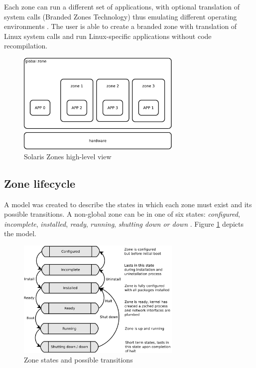 \documentclass[11pt]{book}
\begin{document}
        Each zone can run a different set of applications, with optional translation of system calls (Branded Zones
        Technology) thus emulating different operating environments \cite{sag}. The user is able to create a branded
        zone with translation of Linux system calls and run Linux-specific applications without code recompilation.

        \begin{figure}[H]
          \begin{center}
            \includegraphics[width=0.7\textwidth]{img/solaris/zones-high-level.pdf}
          \end{center}

          \caption{Solaris Zones high-level view}
        \end{figure}


      \subsection{Zone lifecycle}
      \label{sub:}

        A model was created to describe the states in which each zone must exist and its possible transitions. A
        non-global zone can be in one of six states: \textit{configured}, \textit{incomplete}, \textit{installed},
        \textit{ready}, \textit{running}, \textit{shutting down or down} \cite{sag}. Figure \ref{fig:sol:lifecycle}
        depicts the model.

        \begin{figure}[H]
          \begin{center}
            \includegraphics[width=0.7\textwidth]{img/solaris/zone_states.pdf}
          \end{center}

          \caption{Zone states and possible transitions}
          \label{fig:sol:lifecycle}
        \end{figure}
\end{document}
